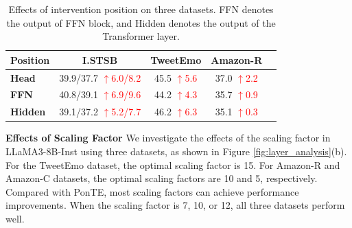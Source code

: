 \documentclass[11pt]{article}
\newcommand{\up}[1]{\textcolor{red}{{$\uparrow$#1}}}
\begin{document}
\begin{table}[t] \small
    \centering
    \setlength{\tabcolsep}{5pt}
    \begin{tabular}{lcccc}
        \toprule
        \textbf{Position} & \textbf{I.STSB} & \textbf{TweetEmo} & \textbf{Amazon-R}\\
        \midrule
        \textbf{Head} &39.9/37.7   \up{6.0/8.2} &45.5   \up{5.6}&37.0  \up{2.2}\\
        \textbf{FFN} &40.8/39.1  \up{6.9/9.6} &44.2 \up{4.3} &35.7 \up{0.9}\\
        \textbf{Hidden} &39.1/37.2  \up{5.2/7.7} &46.2 \up{6.3} & 35.1 \up{0.3}\\
        \bottomrule
    \end{tabular}
    \caption{Effects of intervention position on three datasets. FFN denotes the output of FFN block, and Hidden denotes the output of the Transformer layer.}
    \label{tab:position}
\end{table}


\textbf{Effects of Scaling Factor}
We investigate the effects of the scaling factor in LLaMA3-8B-Inst using three datasets, as shown in Figure \ref{fig:layer_analysis}(b).
For the TweetEmo dataset, the optimal scaling factor is 15. For Amazon-R and Amazon-C datasets, the optimal scaling factors are 10 and 5, respectively.
Compared with PonTE, most scaling factors can achieve performance improvements. When the scaling factor is 7, 10, or 12, all three datasets perform well.
\end{document}
